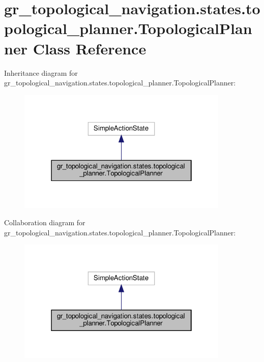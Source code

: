 \hypertarget{classgr__topological__navigation_1_1states_1_1topological__planner_1_1TopologicalPlanner}{}\section{gr\+\_\+topological\+\_\+navigation.\+states.\+topological\+\_\+planner.\+Topological\+Planner Class Reference}
\label{classgr__topological__navigation_1_1states_1_1topological__planner_1_1TopologicalPlanner}


Inheritance diagram for gr\+\_\+topological\+\_\+navigation.\+states.\+topological\+\_\+planner.\+Topological\+Planner\+:
\nopagebreak
\begin{figure}[H]
\begin{center}
\leavevmode
\includegraphics[width=286pt]{classgr__topological__navigation_1_1states_1_1topological__planner_1_1TopologicalPlanner__inherit__graph}
\end{center}
\end{figure}


Collaboration diagram for gr\+\_\+topological\+\_\+navigation.\+states.\+topological\+\_\+planner.\+Topological\+Planner\+:
\nopagebreak
\begin{figure}[H]
\begin{center}
\leavevmode
\includegraphics[width=286pt]{classgr__topological__navigation_1_1states_1_1topological__planner_1_1TopologicalPlanner__coll__graph}
\end{center}
\end{figure}
